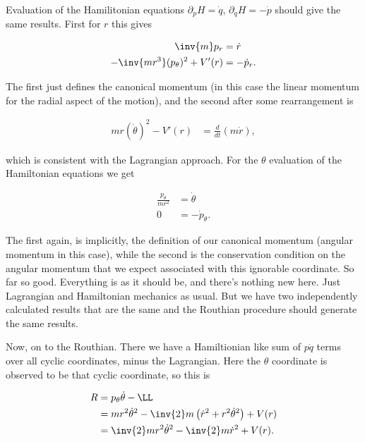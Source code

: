 Evaluation of the Hamilitonian equations $\partial_p H = \dot{q}$, $\partial_q H = -\dot{p}$ should give the same results.  First for $r$ this gives

\begin{align}\label{eqn:goldsteinRouth:32}
\inv{m} p_r &= \dot{r} \\
-\inv{m r^3} (p_\theta)^2 + V'(r) &= -\dot{p}_r.
\end{align}

The first just defines the canonical momentum (in this case the linear momentum for the radial aspect of the motion), and the second after some rearrangement is

\begin{align}\label{eqn:goldsteinRouth:33}
m r (\dot{\theta})^2 - V'(r) &= \frac{d}{dt}\left( m \dot{r} \right),
\end{align}

which is consistent with the Lagrangian approach.  For the $\theta$ evaluation of the Hamiltonian equations we get

\begin{align}\label{eqn:goldsteinRouth:34}
\frac{p_\theta}{m r^2} &= \dot{\theta} \\
0 &= -\dot{p}_\theta.
\end{align}

The first again, is implicitly, the definition of our canonical momentum (angular momentum in this case), while the second is the conservation condition on the angular momentum that we expect associated with this ignorable coordinate.  So far so good.  Everything is as it should be, and there's nothing new here.  Just Lagrangian and Hamiltonian mechanics as usual.  But we have two independently calculated results that are the same and the Routhian procedure should generate the same results.

Now, on to the Routhian.  There we have a Hamiltionian like sum of $p \dot{q}$ terms over all cyclic coordinates, minus the Lagrangian.  Here the $\theta$ coordinate is observed to be that cyclic coordinate, so this is

\begin{align*}
R 
&= p_\theta \dot{\theta} - \LL \\
&= m r^2 \dot{\theta}^2 - \inv{2} m \left(\dot{r}^2 + r^2 \dot{\theta}^2 \right) + V(r) \\
&= \inv{2} m r^2 \dot{\theta}^2 - \inv{2} m \dot{r}^2 + V(r).
\end{align*}

